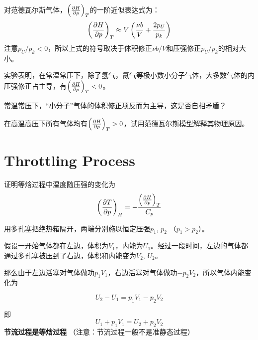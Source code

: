 \documentclass[CJK]{beamer}
\begin{document}
\begin{frame}
\bch

对范德瓦尔斯气体，$\left(\frac{\partial H}{\partial p}\right)_{T}$的一阶近似表达式为：
$$\left(\frac{\partial H}{\partial p}\right)_{T} \approx V\left(\frac{\nu b}{V} +\frac{2p_U}{p_k}\right)$$
注意$p_U/p_k<0$，所以上式的符号取决于体积修正$\nu b/V$和压强修正$p_U/p_k$的相对大小。

实验表明，在{\blue 常温常压下，除了氢气，氦气等极小数小分子气体，大多数气体的内压强修正占主导，有$\left(\frac{\partial H}{\partial p}\right)_{T} < 0$}。

\ech
\end{frame}

\begin{frame}
\bch
{}

常温常压下，“小分子”气体的体积修正项反而为主导，这是否自相矛盾？

\ech
\end{frame}


\begin{frame}
\bch
{}

在高温高压下所有气体均有$\left(\frac{\partial H}{\partial p}\right)_{T} > 0$，试用范德瓦尔斯模型解释其物理原因。

\ech
\end{frame}

\section{Throttling Process}


\begin{frame}
\bch
{}
证明等焓过程中温度随压强的变化为
{\blue
$$\left(\frac{\partial T}{\partial p}\right)_{H} = - \frac{\left(\frac{\partial H}{\partial p}\right)_{T}}{C_p}$$
}
\ech
\end{frame}



\begin{frame}
\bch

\emini
{}
用多孔塞把绝热箱隔开，两端分别施以恒定压强$p_1$, $p_2$ （$p_1>p_2$）。
\emini

{\small

假设一开始气体都在左边，体积为$V_1$，内能为$U_1$。经过一段时间，左边的气体都通过多孔塞被压到了右边，体积和内能变为$V_2$, $U_2$。

那么由于左边活塞对气体做功$p_1V_1$，右边活塞对气体做功$-p_2V_2$，所以气体内能变化为

$$U_2 - U_1  = p_1V_1 - p_2V_2$$

即
$$ U_1 + p_1V_1 = U_2 + p_2V_2 $$
{\blue \bf 节流过程是等焓过程} （注意：节流过程一般不是准静态过程）

}
\ech
\end{frame}
\end{document}
